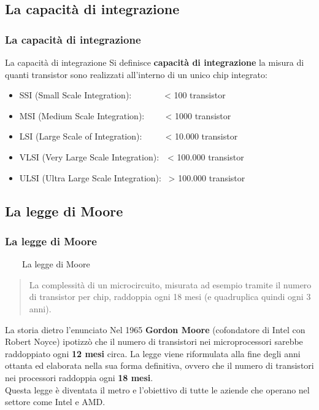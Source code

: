 \subsection[La capacità di integrazione]{La capacità di integrazione}
\begin{frame}
	\frametitle{La capacità di integrazione}
	
	\begin{block}{La capacità di integrazione}
		Si definisce \textbf{capacità di integrazione} la misura di quanti transistor sono realizzati all'interno di un unico chip integrato:
		\begin{itemize}
			\item SSI (Small Scale Integration): $\qquad\quad\,$ < 100 transistor
			\item MSI (Medium Scale Integration): $\quad\;\;\:$ < 1000 transistor
			\item LSI (Large Scale of Integration): $\quad\;\;\,\,\,$ < 10.000 transistor
			\item VLSI (Very Large Scale Integration): $\,\,$ < 100.000 transistor
			\item ULSI (Ultra Large Scale Integration): $\,$ > 100.000 transistor
		\end{itemize}
		
	\end{block}
	
\end{frame}


\subsection[La legge di Moore]{La legge di Moore}
\begin{frame}
	\frametitle{La legge di Moore}
	
	\begin{block}{$\qquad$La legge di Moore}
		\begin{quote}
			La complessità di un microcircuito, misurata ad esempio tramite il numero di transistor per chip, raddoppia ogni 18 mesi (e quadruplica quindi ogni 3 anni).
		\end{quote}		
	\end{block}
	
	\pause
	
	\begin{block}{La storia dietro l'enunciato}
		Nel 1965 \textbf{Gordon Moore} (cofondatore di Intel con Robert Noyce) ipotizzò che il numero di transistori nei microprocessori sarebbe raddoppiato ogni \textbf{12 mesi} circa. 	La legge viene riformulata alla fine degli anni ottanta ed elaborata nella sua forma definitiva, ovvero che il numero di transistori nei processori raddoppia ogni \textbf{18 mesi}.\\
		Questa legge è diventata il metro e l'obiettivo di tutte le aziende che operano nel settore come Intel e AMD.
	\end{block}
	
\end{frame}



